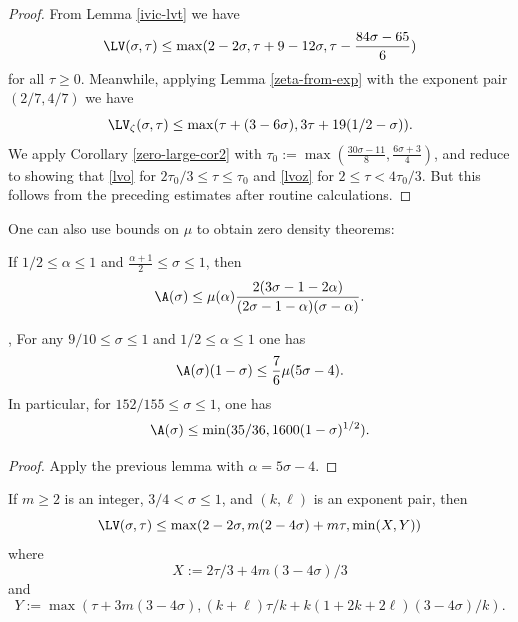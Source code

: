 \begin{proof}  From Lemma \ref{ivic-lvt} we have
$$  \LV(\sigma,\tau) \leq \max( 2-2\sigma, \tau + 9-12\sigma, \tau - \frac{84\sigma-65}{6})$$
for all $\tau \geq 0$.  Meanwhile, applying Lemma \ref{zeta-from-exp} with the exponent pair $(2/7,4/7)$ we have
$$ \LV_\zeta(\sigma,\tau) \leq \max( \tau + (3-6\sigma), 3\tau + 19(1/2-\sigma)).$$
We apply Corollary \ref{zero-large-cor2} with $\tau_0 := \max( \frac{30\sigma-11}{8}, \frac{6\sigma+3}{4} )$, and reduce to showing that \eqref{lvo} for $2\tau_0/3 \leq \tau \leq \tau_0$ and \eqref{lvoz} for $2 \leq \tau < 4\tau_0/3$.  But this follows from the preceding estimates after routine calculations.
\end{proof}

One can also use bounds on $\mu$ to obtain zero density theorems:

\begin{lemma}\label{zero_from_mu}\cite[Theorem 12.3]{montgomery_topics_1971} If $1/2 \leq \alpha \leq 1$ and $\frac{\alpha+1}{2} \leq \sigma \leq 1$, then
$$ \A(\sigma) \leq \mu(\alpha) \frac{2(3\sigma-1-2\alpha)}{(2\sigma-1-\alpha)(\sigma-\alpha)}.$$
\end{lemma}

\begin{corollary}\label{ivic-zero-density-large}\cite{montgomery_topics_1971}, \cite[Theorem 11.3]{ivic} For any $9/10 \leq \sigma \leq 1$ and $1/2 \leq \alpha \leq 1$ one has
    $$ \A(\sigma)(1-\sigma) \leq \frac{7}{6} \mu(5\sigma-4).$$
In particular, for $152/155 \leq \sigma \leq 1$, one has
$$ \A(\sigma) \leq \min( 35/36, 1600 (1-\sigma)^{1/2} ).$$
\end{corollary}

\literature
{}

\begin{proof} Apply the previous lemma with $\alpha = 5\sigma-4$.
\end{proof}

\begin{lemma}\label{a-ivt-1}  If $m \geq 2$ is an integer, $3/4 < \sigma \leq 1$, and $(k,\ell)$ is an exponent pair, then
$$ \LV(\sigma,\tau) \leq \max( 2-2\sigma, m(2-4\sigma) + m\tau, \min( X, Y ))$$
where
$$ X := 2\tau/3 + 4m(3-4\sigma)/3$$
and
$$ Y := \max( \tau + 3m(3-4\sigma), (k+\ell)\tau/k + k(1+2k+2\ell)(3-4\sigma)/k).$$
\end{lemma}

